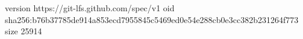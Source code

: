 version https://git-lfs.github.com/spec/v1
oid sha256:b76b37785de914a853ecd7955845c5469ed0e54e288cb0e3cc382b231264f773
size 25914
